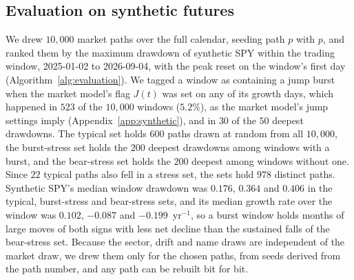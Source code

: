 \subsection{Evaluation on synthetic futures}\label{sec:method-evaluation}

We drew $10{,}000$ market paths over the full calendar, seeding path $p$ with $p$, and ranked them by the maximum
drawdown of synthetic SPY within the trading window, 2025-01-02 to 2026-09-04, with the peak reset on the window's
first day (Algorithm~\ref{alg:evaluation}). We tagged a window as containing a jump burst when the market model's flag
$J(t)$ was set on any of its growth days, which happened in $523$ of the $10{,}000$ windows ($5.2\%$), as the market
model's jump settings imply (Appendix~\ref{app:synthetic}), and in $30$ of the $50$ deepest drawdowns. The typical
set holds $600$ paths drawn at random from all $10{,}000$, the burst-stress set holds the $200$ deepest drawdowns among
windows with a burst, and the bear-stress set holds the $200$ deepest among windows without one. Since $22$ typical
paths also fell in a stress set, the sets hold $978$ distinct paths. Synthetic SPY's median window drawdown was
$0.176$, $0.364$ and $0.406$ in the typical, burst-stress and bear-stress sets, and its median growth rate over the
window was $0.102$, $-0.087$ and $-0.199$~yr$^{-1}$, so a burst window holds months of large moves of both signs with
less net decline than the sustained falls of the bear-stress set. Because the sector, drift and name draws are
independent of the market draw, we drew them only for the chosen paths, from seeds derived from the path number, and
any path can be rebuilt bit for bit.

